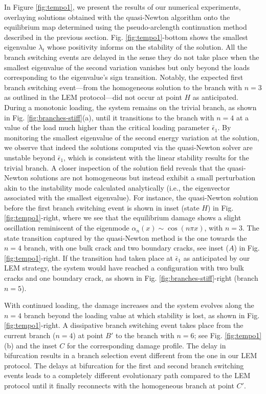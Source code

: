 \documentclass[10pt]{article}
\begin{document}
In Figure \ref{fig:tempo1}, we present the results of our numerical experiments, overlaying solutions obtained with the quasi-Newton algorithm onto the equilibrium map determined using the pseudo-arclength continuation method described in the previous section. Fig. \ref{fig:tempo1}-bottom shows the smallest eigenvalue $\lambda_t$ whose positivity informs on the stability of the solution. All the branch switching events are delayed in the sense they do not take place when the smallest eigenvalue of the second variation vanishes but only beyond the loads corresponding to the eigenvalue's sign transition. Notably, the expected first branch switching event—from the {homogeneous} solution to the branch with \(n=3\) as outlined in the LEM protocol—did not occur at point $H$ as anticipated. During a monotonic loading, the system remains on the trivial branch, as shown in Fig. \ref{fig:branches-stiff}(a), until it transitions to the branch with \(n=4\) at a value of the load much higher than the critical loading parameter \(\bar{\epsilon}_1\). By monitoring the smallest eigenvalue of the second energy variation at the solution, we observe that indeed the solutions computed via the quasi-Newton solver are unstable beyond \(\bar{\epsilon}_1\), which is consistent with the linear stability results for the trivial branch. A closer inspection of the solution field reveals that the quasi-Newton solutions are not homogeneous but instead exhibit a small perturbation akin to the instability mode calculated analytically (i.e., the eigenvector associated with the smallest eigenvalue). For instance, the  quasi-Newton solution before the first branch switching event is shown in inset (state $H$) in Fig. \ref{fig:tempo1}-right, where we see that the equilibrium damage shows a slight oscillation reminiscent of the eigenmode \(\alpha_n(x) \sim \cos(n\pi x)\), with \(n=3\). The state transition captured by the quasi-Newton method is the one towards the \(n=4\) branch, with one bulk crack and two boundary cracks, see inset ($A$) in Fig. \ref{fig:tempo1}-right. If the transition had taken place at \(\bar{\epsilon}_1\) as anticipated by our LEM strategy, the system would have reached a configuration with two bulk cracks and one boundary crack, as shown in Fig. \ref{fig:branches-stiff}-right (branch $n=5$).

With continued loading, the damage increases and the system evolves along the \(n=4\) branch beyond the loading value at which stability is lost, as shown in Fig. \ref{fig:tempo1}-right. A dissipative branch switching event takes place from the current branch (\(n=4\)) at point \(B'\) to the branch with \(n=6\); see Fig. \ref{fig:tempo1}(b) and the inset $C$ for the corresponding damage profile. The delay in bifurcation results in a branch selection event different from the one in our LEM protocol. The delays at bifurcation for the first and second branch switching events leads to a completely different evolutionary path compared to the LEM protocol until it finally reconnects with the homogeneous branch at point \(C'\).
\end{document}
